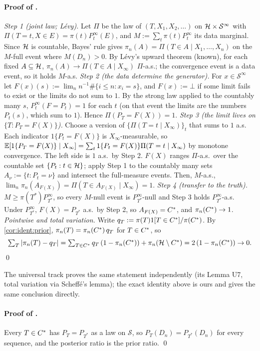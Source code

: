 \paragraph{Proof of .}
\emph{Step 1 (joint law; L\'evy).} Let $\Pi$ be the law of $(T,X_1,X_2,\dots)$ on $\mathcal{H}\times\mathcal S^\infty$ with $\Pi(T=t,X\in E)=\pi(t)P_t^\infty(E)$, and $M:=\sum_t\pi(t)P_t^\infty$ its data marginal. Since $\mathcal{H}$ is countable, Bayes' rule gives $\pi_n(A)=\Pi(T\in A\mid X_1,\dots,X_n)$ on the $M$-full event where $M(D_n)>0$. By L\'evy's upward theorem (known), for each fixed $A\subseteq\mathcal{H}$, $\pi_n(A)\to\Pi(T\in A\mid X_\infty)$ $\Pi$-a.s.; the convergence event is a data event, so it holds $M$-a.s.
\emph{Step 2 (the data determine the generator).} For $x\in\mathcal S^\infty$ let $F(x)(s):=\lim_nn^{-1}\#\{i\le n:x_i=s\}$, and $F(x):=\bot$ if some limit fails to exist or the limits do not sum to $1$. By the strong law applied to the countably many $s$, $P_t^\infty(F=P_t)=1$ for each $t$ (on that event the limits are the numbers $P_t(s)$, which sum to $1$). Hence $\Pi(P_T=F(X))=1$.
\emph{Step 3 (the limit lives on $\{T:P_T=F(X)\}$).} Choose a version of $\{\Pi(T=t\mid X_\infty)\}_t$ that sums to $1$ a.s. Each indicator $1\{P_t=F(X)\}$ is $X_\infty$-measurable, so $\mathbb{E}[1\{P_T=F(X)\}\mid X_\infty]=\sum_t1\{P_t=F(X)\}\Pi(T=t\mid X_\infty)$ by monotone convergence. The left side is $1$ a.s.\ by Step 2. $F(X)$ ranges $\Pi$-a.s.\ over the countable set $\{P_t:t\in\mathcal{H}\}$; apply Step 1 to the countably many sets $A_\nu:=\{t:P_t=\nu\}$ and intersect the full-measure events. Then, $M$-a.s., $\lim_n\pi_n(A_{F(X)})=\Pi(T\in A_{F(X)}\mid X_\infty)=1$.
\emph{Step 4 (transfer to the truth).} $M\ge\pi(T^*)P_{T^*}^\infty$, so every $M$-null event is $P_{T^*}^\infty$-null and Step 3 holds $P_{T^*}^\infty$-a.s. Under $P_{T^*}^\infty$, $F(X)=P_{T^*}$ a.s.\ by Step 2, so $A_{F(X)}=C^{*}$, and $\pi_n(C^{*})\to1$.
\emph{Pointwise and total variation.} Write $q_T:=\pi(T)1[T\in C^{*}]/\pi(C^{*})$. By \cref{cor:ident:prior}, $\pi_n(T)=\pi_n(C^{*})\,q_T$ for $T\in C^{*}$, so
\[\textstyle\sum_T|\pi_n(T)-q_T|=\sum_{T\in C^{*}}q_T\,(1-\pi_n(C^{*}))+\pi_n(\mathcal{H}\setminus C^{*})=2\,(1-\pi_n(C^{*}))\to0.\]
\qed

The universal track proves the same statement independently (its Lemma U7, total variation via Scheff\'e's lemma); the exact identity above is ours and gives the same conclusion directly.

\paragraph{Proof of .} Every $T\in C^{*}$ has $P_T=P_{T^*}$ as a law on $\mathcal S$, so $P_T(D_n)=P_{T^*}(D_n)$ for every sequence, and the posterior ratio is the prior ratio. \qed


